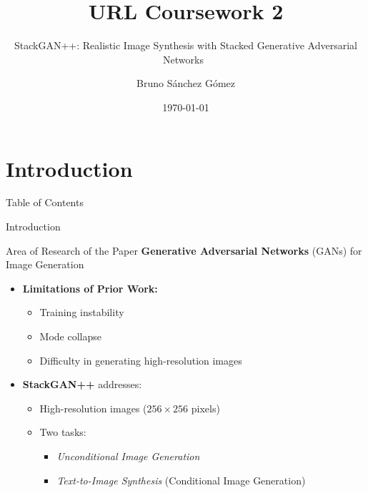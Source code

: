 \documentclass{beamer}
\title{URL Coursework 2}
\subtitle{StackGAN++: Realistic Image Synthesis with Stacked Generative Adversarial Networks~\cite{stackgan++}}
\author{Bruno Sánchez Gómez}
\date{\today}
\begin{document}
\begin{frame}
    \titlepage
\end{frame}

\section{Introduction}
\begin{frame}{Table of Contents}
    \tableofcontents[currentsection]
\end{frame}

\begin{frame}{Introduction}
    \centering
    \begin{minipage}{0.9\textwidth}
        \begin{block}{Area of Research of the Paper}
            \textbf{Generative Adversarial Networks} (GANs) for Image Generation
        \end{block}
    \end{minipage}
    \vspace{1em}
    \begin{itemize}
        \item \textbf{Limitations of Prior Work:}
        \begin{itemize}
            \item Training instability
            \item Mode collapse
            \item Difficulty in generating high-resolution images
        \end{itemize}
    \end{itemize}
    \begin{itemize}
        \item \textbf{StackGAN++} addresses:
        \begin{itemize}
            \item High-resolution images ($256 \times 256$ pixels)
            \item Two tasks:
            \begin{itemize}
                \item \textit{Unconditional Image Generation}
                \item \textit{Text-to-Image Synthesis} (Conditional Image Generation)
            \end{itemize}
        \end{itemize}
    \end{itemize}
\end{frame}
\end{document}
